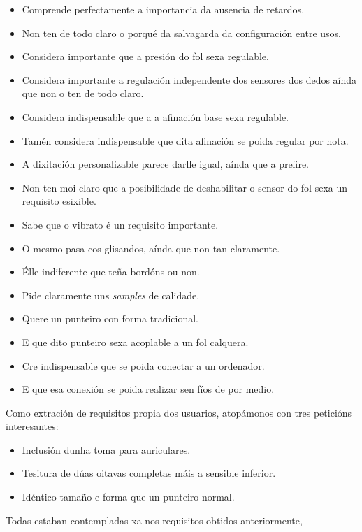   \begin{itemize}
   \item Comprende perfectamente a importancia da ausencia de retardos.
   \item Non ten de todo claro o porqué da salvagarda da configuración entre
         usos.
   \item Considera importante que a presión do fol sexa regulable.
   \item Considera importante a regulación independente dos sensores dos dedos
         aínda que non o ten de todo claro.
   \item Considera indispensable que a a afinación base sexa regulable.
   \item Tamén considera indispensable que dita afinación se poida regular por
         nota.
   \item A dixitación personalizable parece darlle igual, aínda que a prefire.
   \item Non ten moi claro que a posibilidade de deshabilitar o sensor do fol
         sexa un requisito esixible.
   \item Sabe que o vibrato é un requisito importante.
   \item O mesmo pasa cos glisandos, aínda que non tan claramente.
   \item Élle indiferente que teña bordóns ou non.
   \item Pide claramente uns \textit{samples} de calidade.
   \item Quere un punteiro con forma tradicional.
   \item E que dito punteiro sexa acoplable a un fol calquera.
   \item Cre indispensable que se poida conectar a un ordenador.
   \item E que esa conexión se poida realizar sen fíos de por medio.
  \end{itemize}

  Como extración de requisitos propia dos usuarios, atopámonos con tres
  peticións interesantes:

  \begin{itemize}
   \item Inclusión dunha toma para auriculares.
   \item Tesitura de dúas oitavas completas máis a sensible inferior.
   \item Idéntico tamaño e forma que un punteiro normal.
  \end{itemize}

  Todas estaban contempladas xa nos requisitos obtidos anteriormente,

